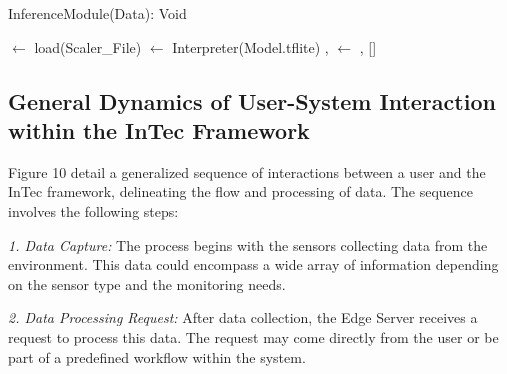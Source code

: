 \documentclass[11pt]{article}
\begin{document}
	\begin{algorithm}[h]
		
		\caption{InferenceModule(Data): Void}
		
		\BlankLine
		\ScalerModel $\leftarrow$ load(Scaler\_File)\;
		\Inferencer $\leftarrow$ Interpreter(Model.tflite)\;
		\SlidingWindow, \ListOfData $\leftarrow$ \ConstantNumber, []\;
		
	\end{algorithm}
	
	\subsection{General Dynamics of User-System Interaction within the InTec Framework}
	Figure 10 detail a generalized sequence of interactions between a user and the InTec framework, delineating the flow and processing of data. The sequence involves the following steps:
	
	\textit{1. Data Capture:} The process begins with the sensors collecting data from the environment. This data could encompass a wide array of information depending on the sensor type and the monitoring needs.
	
	\textit{2. Data Processing Request:} After data collection, the Edge Server receives a request to process this data. The request may come directly from the user or be part of a predefined workflow within the system.
	
\end{document}
